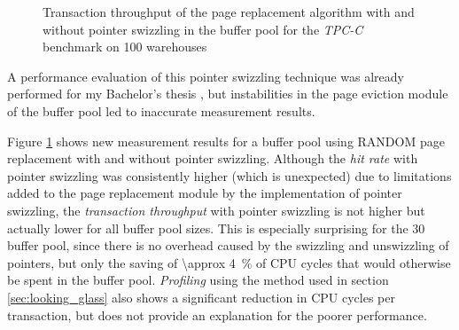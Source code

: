 \begin{@empty}
    \begin{figure}[ht!]
        \centering
        \vspace{.5em}
        \caption[Transaction throughput when using pointer swizzling]{Transaction throughput of the  page replacement algorithm with and without pointer swizzling in the buffer pool for the \textit{TPC-C} benchmark on 100 warehouses}
        \label{fig:swizzlingthroughput}
    \end{figure}
\end{@empty}

    A performance evaluation of this pointer swizzling technique was already performed for my Bachelor's thesis \cite{Gilbert:2017}, but instabilities in the page eviction module of the buffer pool led to inaccurate measurement results.

    Figure \ref{fig:swizzlingthroughput} shows new measurement results for a buffer pool using RANDOM page replacement with and without pointer swizzling. Although the \emph{hit rate} with pointer swizzling was consistently higher (which is unexpected) due to limitations added to the page replacement module by the implementation of pointer swizzling, the \emph{transaction throughput} with pointer swizzling is not higher but actually lower for all buffer pool sizes. This is especially surprising for the \SI{30}{\giga\byte} buffer pool, since there is no overhead caused by the swizzling and unswizzling of pointers, but only the saving of \SI{\approx 4}{\percent} of CPU cycles that would otherwise be spent in the buffer pool. \emph{Profiling} using the method used in section \ref{sec:looking_glass} also shows a significant reduction in CPU cycles per transaction, but does not provide an explanation for the poorer performance.

